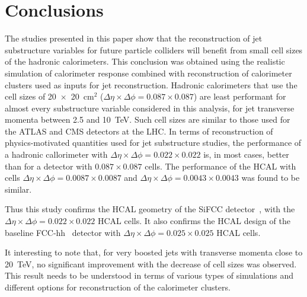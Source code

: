 \section{Conclusions}
The studies presented in this paper show that the reconstruction of jet substructure 
variables for future particle colliders will benefit from small cell sizes of the hadronic calorimeters. 
This conclusion was obtained using the realistic \GEANTfour simulation of calorimeter response combined with reconstruction of 
calorimeter clusters used as inputs for jet reconstruction. 
Hadronic calorimeters that use the cell sizes of 20~$\times $~20~cm$^2$ ($\Delta \eta \times \Delta \phi = 0.087\times 0.087$) 
are least performant for almost every 
substructure variable considered in this analysis, for jet transverse momenta between 2.5 and 10~TeV. 
Such cell sizes are similar to 
those used for the ATLAS and CMS detectors at the LHC. 
In terms of reconstruction of physics-motivated quantities  
used for jet substructure studies, the  performance 
of a  hadronic callorimeter  with 
$\Delta \eta \times \Delta \phi = 0.022\times0.022$ is, in most cases,
better than for a detector with  $0.087\times 0.087$ cells.
The performance of the HCAL with cells $\Delta \eta \times \Delta \phi = 0.0087\times 0.0087$ and
$\Delta \eta \times \Delta \phi = 0.0043\times 0.0043$ was found to be similar.

Thus this study confirms the  HCAL geometry of the SiFCC detector~\cite{Chekanov:2016ppq},
with the $\Delta \eta \times \Delta \phi = 0.022\times0.022$ HCAL cells.
It also confirms the HCAL design of the baseline FCC-hh~\cite{fcc1,fcc2} detector with
$\Delta \eta \times \Delta \phi = 0.025\times0.025$ HCAL cells.

It interesting to note that,  for very boosted jets with transverse momenta close to 20~TeV, no significant improvement with the 
decrease of cell sizes was observed. This result needs to be understood in terms of various types of simulations and 
different options for reconstruction of the calorimeter clusters.
